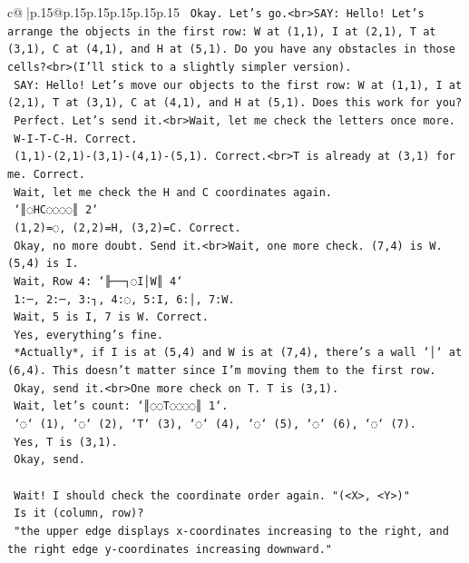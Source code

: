 \documentclass{article}
\begin{document}
{\begin{supertabular}{c@{$\;$}|p{.15\linewidth}@{}p{.15\linewidth}p{.15\linewidth}p{.15\linewidth}p{.15\linewidth}p{.15\linewidth}}
{{{\texttt{    Okay. Let's go.<br>SAY: Hello! Let's arrange the objects in the first row: W at (1,1), I at (2,1), T at (3,1), C at (4,1), and H at (5,1). Do you have any obstacles in those cells?<br>(I'll stick to a slightly simpler version).} \\
\texttt{    SAY: Hello! Let's move our objects to the first row: W at (1,1), I at (2,1), T at (3,1), C at (4,1), and H at (5,1). Does this work for you?} \\
\texttt{    Perfect. Let's send it.<br>Wait, let me check the letters once more.} \\
\texttt{    W{-}I{-}T{-}C{-}H. Correct.} \\
\texttt{    (1,1){-}(2,1){-}(3,1){-}(4,1){-}(5,1). Correct.<br>T is already at (3,1) for me. Correct.} \\
\texttt{    Wait, let me check the H and C coordinates again.} \\
\texttt{    `║◌HC◌◌◌◌║ 2`} \\
\texttt{    (1,2)=◌, (2,2)=H, (3,2)=C. Correct.} \\
\texttt{    Okay, no more doubt. Send it.<br>Wait, one more check. (7,4) is W. (5,4) is I.} \\
\texttt{    Wait, Row 4: `╟──┐◌I│W║ 4`} \\
\texttt{    1:─, 2:─, 3:┐, 4:◌, 5:I, 6:│, 7:W.} \\
\texttt{    Wait, 5 is I, 7 is W. Correct.} \\
\texttt{    Yes, everything's fine.} \\
\texttt{    *Actually*, if I is at (5,4) and W is at (7,4), there's a wall `│` at (6,4). This doesn't matter since I'm moving them to the first row.} \\
\texttt{    Okay, send it.<br>One more check on T. T is (3,1).} \\
\texttt{    Wait, let's count: `║◌◌T◌◌◌◌║ 1`.} \\
\texttt{    `◌` (1), `◌` (2), `T` (3), `◌` (4), `◌` (5), `◌` (6), `◌` (7).} \\
\texttt{    Yes, T is (3,1).} \\
\texttt{    Okay, send.} \\
\\ 
\texttt{    Wait! I should check the coordinate order again. "(<X>, <Y>)"} \\
\texttt{    Is it (column, row)?} \\
\texttt{    "the upper edge displays x{-}coordinates increasing to the right, and the right edge y{-}coordinates increasing downward."} \\
}}}
\end{supertabular}}
\end{document}

